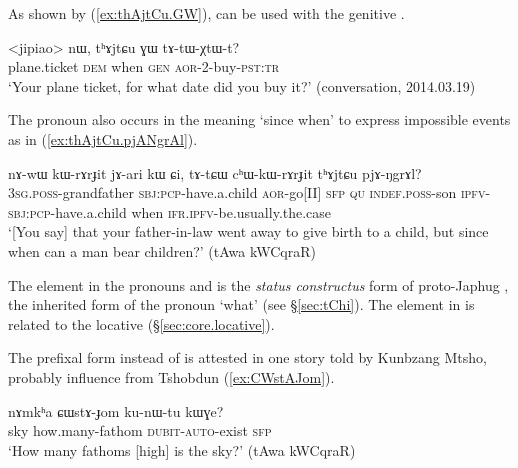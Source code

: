 As shown by (\ref{ex:thAjtCu.GW}),  can be used with the genitive .

\begin{exe}
\ex \label{ex:thAjtCu.GW}
\gll <jipiao> nɯ, tʰɤjtɕu ɣɯ tɤ-tɯ-χtɯ-t? \\
plane.ticket \textsc{dem} when \textsc{gen} \textsc{aor}-2-buy-\textsc{pst}:\textsc{tr} \\
\glt `Your plane ticket, for what date did you buy it?' (conversation, 2014.03.19)
\end{exe} 

 
The pronoun  also occurs in the meaning `since when' to express impossible events as in (\ref{ex:thAjtCu.pjANgrAl}).

\begin{exe}
\ex \label{ex:thAjtCu.pjANgrAl}
\gll  nɤ-wɯ kɯ-rɤrɟit jɤ-ari kɯ ɕi, tɤ-tɕɯ cʰɯ-kɯ-rɤrɟit tʰɤjtɕu pjɤ-ŋgrɤl? \\
\textsc{3sg}.\textsc{poss}-grandfather \textsc{sbj}:\textsc{pcp}-have.a.child \textsc{aor}-go[II] \textsc{sfp} \textsc{qu} \textsc{indef}.\textsc{poss}-son \textsc{ipfv}-\textsc{sbj}:\textsc{pcp}-have.a.child when \textsc{ifr}.\textsc{ipfv}-be.usually.the.case \\
\glt `[You say] that your father-in-law went away to give birth to a child, but since when can a man bear children?' (tAwa kWCqraR)
\end{exe} 

The element  in the pronouns   and  is the \textit{status constructus} form of proto-Japhug , the inherited form of the pronoun `what' (see §\ref{sec:tChi}). The element  in  is related to the locative  (§\ref{sec:core.locative}).

The prefixal form  instead of  is attested in one story told by Kunbzang Mtsho, probably influence from Tshobdun (\ref{ex:CWstAJom}).

\begin{exe}
\ex \label{ex:CWstAJom}
\gll nɤmkʰa ɕɯstɤ-ɟom ku-nɯ-tu kɯɣe?\\
sky how.many-fathom \textsc{dubit}-\textsc{auto}-exist \textsc{sfp} \\
\glt `How many fathoms [high] is the sky?' (tAwa kWCqraR)
\end{exe}%

\subsection{} \label{sec:NotCu}

